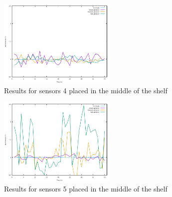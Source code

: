 \begin{figure}[ht] \centering
  \includegraphics[width=0.5\textwidth]{img/sensor-4-middle}
  \caption{Results for sensors 4 placed in the middle of the shelf}
  \label{fig:middle-4}
\end{figure}

\begin{figure}[ht] \centering
  \includegraphics[width=0.5\textwidth]{img/sensor-5-middle}
  \caption{Results for sensors 5 placed in the middle of the shelf}
  \label{fig:middle-5}
\end{figure}

